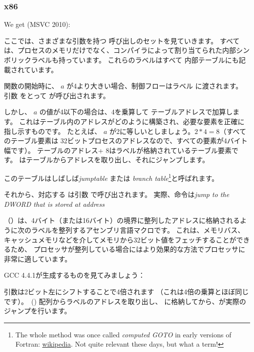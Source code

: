 ﻿\subsubsection{x86}


We get (MSVC 2010):




ここでは、さまざまな引数を持つ \printf 呼び出しのセットを見ていきます。
すべては、プロセスのメモリだけでなく、コンパイラによって割り当てられた内部シンボリックラベルも持っています。
これらのラベルはすべて  内部テーブルにも記載されています。

関数の開始時に、 $a$ が4より大きい場合、制御フローはラベル に渡されます。
引数 をとって \printf が呼び出されます。

しかし、 $a$ の値が4以下の場合は、4を乗算して テーブルアドレスで加算します。 
これはテーブル内のアドレスがどのように構築され、必要な要素を正確に指し示すものです。 
たとえば、 $a$ が2に等しいとしましょう。$2*4 = 8$（すべてのテーブル要素は
32ビットプロセスのアドレスなので、すべての要素が4バイト幅です）。
テーブルのアドレス+ 8はラベルが格納されているテーブル要素です。
\JMP はテーブルからアドレスを取り出し、それにジャンプします。

このテーブルはしばしば\emph{jumptable} または \emph{branch table}\footnote{The whole method was once called 
\emph{computed GOTO} in early versions of Fortran:
\href{http://go.yurichev.com/17122}{wikipedia}.
Not quite relevant these days, but what a term!}と呼ばれます。

それから、対応する \printf は引数 で呼び出されます。
実際、命令は\emph{jump to the DWORD that is stored at address} 

（）は、4バイト（または16バイト）の境界に整列したアドレスに格納されるように次のラベルを整列するアセンブリ言語マクロです。
これは、メモリバス、キャッシュメモリなどを介してメモリから32ビット値をフェッチすることができるため、
プロセッサが整列している場合にはより効果的な方法でプロセッサに非常に適しています。



\label{switch_lot_GCC}

GCC 4.4.1が生成するものを見てみましょう：




引数は2ビット左にシフトすることで4倍されます
（これは4倍の乗算とほぼ同じです）。~()
配列からラベルのアドレスを取り出し、 \EAX に格納してから、が実際のジャンプを行います。

